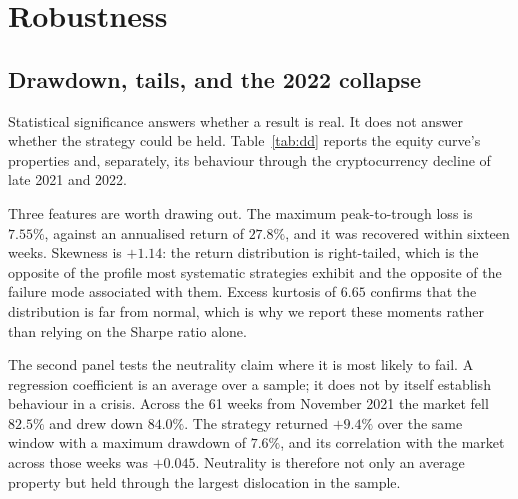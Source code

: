 \documentclass[11pt,letterpaper]{article}
\begin{document}
\section{Robustness}

\subsection{Drawdown, tails, and the 2022 collapse}
\label{sec:drawdown}

Statistical significance answers whether a result is real. It does not answer
whether the strategy could be held. Table~\ref{tab:dd} reports the equity curve's
properties and, separately, its behaviour through the cryptocurrency decline of
late 2021 and 2022.

Three features are worth drawing out. The maximum peak-to-trough loss is
$7.55\%$, against an annualised return of $27.8\%$, and it was recovered within
sixteen weeks. Skewness is $+1.14$: the return distribution is right-tailed,
which is the opposite of the profile most systematic strategies exhibit and the
opposite of the failure mode associated with them. Excess kurtosis of $6.65$
confirms that the distribution is far from normal, which is why we report these
moments rather than relying on the Sharpe ratio alone.

The second panel tests the neutrality claim where it is most likely to fail. A
regression coefficient is an average over a sample; it does not by itself
establish behaviour in a crisis. Across the 61 weeks from November 2021 the
market fell $82.5\%$ and drew down $84.0\%$. The strategy returned $+9.4\%$ over
the same window with a maximum drawdown of $7.6\%$, and its correlation with the
market across those weeks was $+0.045$. Neutrality is therefore not only an
average property but held through the largest dislocation in the sample.
\end{document}
